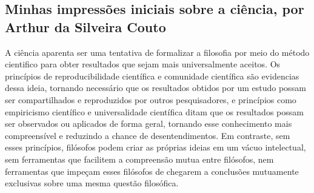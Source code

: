 \subsection{Minhas impressões iniciais sobre a ciência, por Arthur da Silveira Couto}

A ciência aparenta ser uma tentativa de formalizar a filosofia por meio do método cientifico para obter resultados que sejam mais universalmente aceitos. Os princípios de reproducibilidade científica e comunidade científica são evidencias dessa ideia, tornando necessário que os resultados obtidos por um estudo possam ser compartilhados e reproduzidos por outros pesquisadores, e princípios como empiricismo científico e universalidade científica ditam que os resultados possam ser observados ou aplicados de forma geral, tornando esse conhecimento mais compreensível e reduzindo a chance de desentendimentos. Em contraste, sem esses princípios, filósofos podem criar as próprias ideias em um vácuo intelectual, sem ferramentas que facilitem a compreensão mutua entre filósofos, nem ferramentas que impeçam esses filósofos de chegarem a conclusões mutuamente exclusivas sobre uma mesma questão filosófica. 